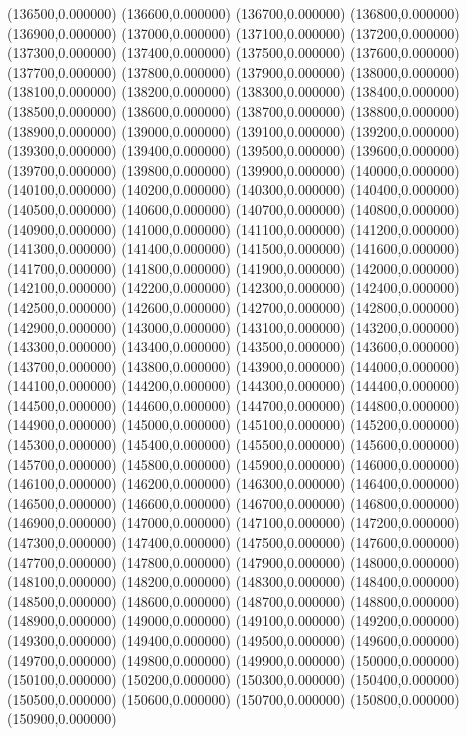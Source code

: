 (136500,0.000000)
(136600,0.000000)
(136700,0.000000)
(136800,0.000000)
(136900,0.000000)
(137000,0.000000)
(137100,0.000000)
(137200,0.000000)
(137300,0.000000)
(137400,0.000000)
(137500,0.000000)
(137600,0.000000)
(137700,0.000000)
(137800,0.000000)
(137900,0.000000)
(138000,0.000000)
(138100,0.000000)
(138200,0.000000)
(138300,0.000000)
(138400,0.000000)
(138500,0.000000)
(138600,0.000000)
(138700,0.000000)
(138800,0.000000)
(138900,0.000000)
(139000,0.000000)
(139100,0.000000)
(139200,0.000000)
(139300,0.000000)
(139400,0.000000)
(139500,0.000000)
(139600,0.000000)
(139700,0.000000)
(139800,0.000000)
(139900,0.000000)
(140000,0.000000)
(140100,0.000000)
(140200,0.000000)
(140300,0.000000)
(140400,0.000000)
(140500,0.000000)
(140600,0.000000)
(140700,0.000000)
(140800,0.000000)
(140900,0.000000)
(141000,0.000000)
(141100,0.000000)
(141200,0.000000)
(141300,0.000000)
(141400,0.000000)
(141500,0.000000)
(141600,0.000000)
(141700,0.000000)
(141800,0.000000)
(141900,0.000000)
(142000,0.000000)
(142100,0.000000)
(142200,0.000000)
(142300,0.000000)
(142400,0.000000)
(142500,0.000000)
(142600,0.000000)
(142700,0.000000)
(142800,0.000000)
(142900,0.000000)
(143000,0.000000)
(143100,0.000000)
(143200,0.000000)
(143300,0.000000)
(143400,0.000000)
(143500,0.000000)
(143600,0.000000)
(143700,0.000000)
(143800,0.000000)
(143900,0.000000)
(144000,0.000000)
(144100,0.000000)
(144200,0.000000)
(144300,0.000000)
(144400,0.000000)
(144500,0.000000)
(144600,0.000000)
(144700,0.000000)
(144800,0.000000)
(144900,0.000000)
(145000,0.000000)
(145100,0.000000)
(145200,0.000000)
(145300,0.000000)
(145400,0.000000)
(145500,0.000000)
(145600,0.000000)
(145700,0.000000)
(145800,0.000000)
(145900,0.000000)
(146000,0.000000)
(146100,0.000000)
(146200,0.000000)
(146300,0.000000)
(146400,0.000000)
(146500,0.000000)
(146600,0.000000)
(146700,0.000000)
(146800,0.000000)
(146900,0.000000)
(147000,0.000000)
(147100,0.000000)
(147200,0.000000)
(147300,0.000000)
(147400,0.000000)
(147500,0.000000)
(147600,0.000000)
(147700,0.000000)
(147800,0.000000)
(147900,0.000000)
(148000,0.000000)
(148100,0.000000)
(148200,0.000000)
(148300,0.000000)
(148400,0.000000)
(148500,0.000000)
(148600,0.000000)
(148700,0.000000)
(148800,0.000000)
(148900,0.000000)
(149000,0.000000)
(149100,0.000000)
(149200,0.000000)
(149300,0.000000)
(149400,0.000000)
(149500,0.000000)
(149600,0.000000)
(149700,0.000000)
(149800,0.000000)
(149900,0.000000)
(150000,0.000000)
(150100,0.000000)
(150200,0.000000)
(150300,0.000000)
(150400,0.000000)
(150500,0.000000)
(150600,0.000000)
(150700,0.000000)
(150800,0.000000)
(150900,0.000000)
